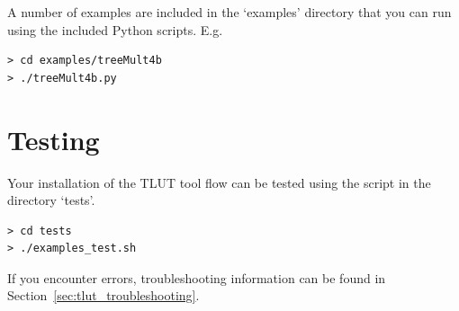 \documentclass[a4paper,oneside]{memoir}
\begin{document}
A number of examples are included in the `examples' directory that you can run using the included Python scripts.
E.g.
\begin{lstlisting}
> cd examples/treeMult4b
> ./treeMult4b.py
\end{lstlisting}

\section{Testing}\label{sec:tlut_testing}
Your installation of the TLUT tool flow can be tested using the script in the directory `tests'.
\begin{lstlisting}
> cd tests
> ./examples_test.sh
\end{lstlisting}
If you encounter errors, troubleshooting information can be found in Section~\ref{sec:tlut_troubleshooting}.
\end{document}
